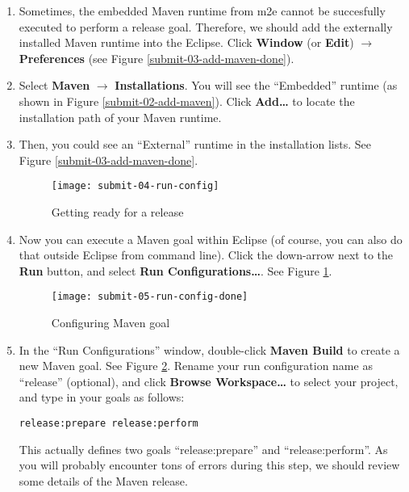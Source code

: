 \begin{enumerate}
\item Sometimes, the embedded Maven runtime from m2e cannot be succesfully
executed to perform a release goal. Therefore, we should add the externally
installed Maven runtime into the Eclipse. Click \textbf{Window} (or
\textbf{Edit}) $\rightarrow$ \textbf{Preferences} (see Figure
\ref{submit-03-add-maven-done}).

\item Select \textbf{Maven} $\rightarrow$ \textbf{Installations}. You will see
the ``Embedded'' runtime (as shown in Figure \ref{submit-02-add-maven}). Click
\textbf{Add\ldots} to locate the installation path of your Maven runtime.

\item Then, you could see an ``External'' runtime in the installation lists. See
Figure \ref{submit-03-add-maven-done}.

\begin{figure}
\centering
\texttt{[image: submit-04-run-config]}
\caption{Getting ready for a release\label{submit-04-run-config}}
\end{figure}

\item Now you can execute a Maven goal within Eclipse (of course, you can also
do that outside Eclipse from command line). Click the down-arrow next to the
\textbf{Run} button, and select \textbf{Run Configurations\ldots}. See Figure
\ref{submit-04-run-config}.

\begin{figure}
\centering
\texttt{[image: submit-05-run-config-done]}
\caption{Configuring Maven goal\label{submit-05-run-config-done}}
\end{figure}

\item In the ``Run Configurations'' window, double-click \textbf{Maven Build} to
create a new Maven goal. See Figure \ref{submit-05-run-config-done}. Rename your
run configuration name as ``release'' (optional), and click \textbf{Browse
Workspace\ldots} to select your project, and type in your goals as follows:

\begin{verbatim}
release:prepare release:perform
\end{verbatim}

This actually defines two goals ``release:prepare'' and ``release:perform''. As
you will probably encounter tons of errors during this step, we should review
some details of the Maven release.


\end{enumerate}
